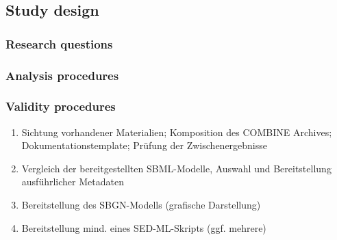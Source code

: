 \subsection*{Study design} %

\subsubsection*{Research questions}
\subsubsection*{Analysis procedures}
\subsubsection*{Validity procedures}

\begin{enumerate}
    \item Sichtung vorhandener Materialien; Komposition des COMBINE Archives; Dokumentationstemplate; Prüfung der Zwischenergebnisse
    \item Vergleich der bereitgestellten SBML-Modelle, Auswahl und Bereitstellung ausführlicher Metadaten
    \item Bereitstellung des SBGN-Modells (grafische Darstellung) 
    \item Bereitstellung mind. eines SED-ML-Skripts (ggf. mehrere)
\end{enumerate}

